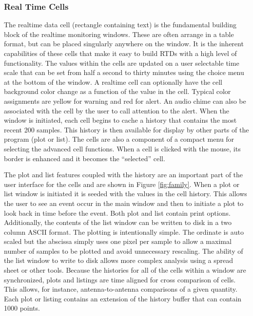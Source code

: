 \documentclass[preprint]{aastex}
\begin{document}
\subsubsection{Real Time Cells}
The realtime data cell (rectangle containing text) is the fundamental
building block of the realtime monitoring windows.  These are
often arrange in a table format, but can be placed singularly anywhere
on the window. It is the inherent
capabilities of these cells that make it easy to build RTDs with a high
level of functionality.  The values within the cells are updated on a
user selectable time scale that can be set from half a second to thirty
minutes using the choice menu at the bottom of the window.  A realtime
cell can optionally have the cell background color change as a function
of the value in the cell.  Typical color assignments are yellow for
warning and red for alert.  An audio chime can also be associated with
the cell by the user to call attention to the alert.  When the window
is initiated, each cell begins to cache a history that contains the most
recent 200 samples.  This history is then available for display by other
parts of the program (plot or list).  The cells are also a component of
a compact menu for selecting the advanced cell functions.  When a cell
is clicked with the mouse, its border is enhanced and it becomes the
``selected'' cell.

The plot and list features coupled with the history are an important part of
the user interface for the cells and are shown in Figure \ref{fig:family}.
When a plot or list window is initiated it is seeded with the values in
the cell history.  This allows the user to see an event occur in the main
window and then to initiate a plot to look back in time before the event.
Both plot and list contain print options.  Additionally, the contents
of the list window can be written to disk in a two column ASCII format.
The plotting is intentionally simple.  The ordinate is auto scaled but
the abscissa simply uses one pixel per sample to allow a maximal number
of samples to be plotted and avoid unnecessary rescaling.  The ability
of the list window to write to disk allows more complex analysis using a
spread sheet or other tools.  Because the histories for all of the cells
within a window are synchronized, plots and listings are time aligned for
cross comparison of cells.  This allows, for instance, antenna-to-antenna
comparisons of a given quantity. Each plot or listing contains an extension
of the history buffer that can contain 1000 points.
\end{document}
